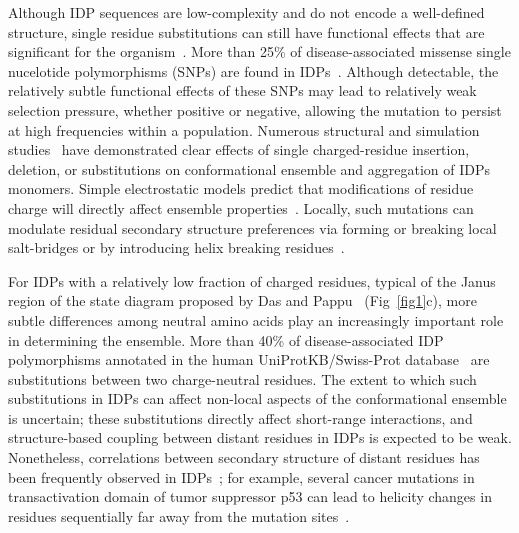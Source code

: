 \documentclass[10pt,letterpaper]{article}
\begin{document}
Although IDP sequences are low-complexity and do not encode a well-defined structure, single residue substitutions can still have functional effects that are significant for the organism~\cite{Uversky2008}. More than 25\% of disease-associated missense single nucelotide polymorphisms (SNPs) are found in IDPs~\cite{Vacic2012a}. Although detectable, the relatively subtle functional effects of these SNPs may lead to relatively weak selection pressure, whether positive or negative, allowing the mutation to persist at high frequencies within a population. Numerous structural and simulation studies~\cite{Larini2013b,Ganguly2015,Viet2014a,Viet2013,Truong2014a,Zhan2013a,Xu2013a} have demonstrated clear effects of single charged-residue insertion, deletion, or substitutions on conformational ensemble and aggregation of IDPs monomers. Simple electrostatic models predict that modifications of residue charge will directly affect ensemble properties~\cite{Das2015,Larini2013b,Bah2016,He2015}. Locally, such mutations can modulate residual secondary structure preferences via forming or breaking local salt-bridges or by introducing helix breaking residues~\cite{AlexanderConicella2016,Ganguly2015,Zhan2013a}. 

For IDPs with a relatively low fraction of charged residues, typical of the Janus region of the state diagram proposed by Das and Pappu~\cite{Das2015,Das2013} (Fig~\ref{fig1}c), more subtle differences among neutral amino acids play an increasingly important role in determining the ensemble. More than 40\% of disease-associated IDP polymorphisms annotated in the human UniProtKB/Swiss-Prot database~\cite{Yip2008} are substitutions between two charge-neutral residues. The extent to which such substitutions in IDPs can affect non-local aspects of the conformational ensemble is uncertain; these substitutions directly affect short-range interactions, and structure-based coupling between distant residues in IDPs is expected to be weak. Nonetheless, correlations between secondary structure of distant residues has been frequently observed in IDPs~\cite{Ganguly2015,Iesmantavicius2013,Feuerstein2012}; for example, several cancer mutations in transactivation domain of tumor suppressor p53 can lead to helicity changes in residues sequentially far away from the mutation sites~\cite{Ganguly2015}. 
\end{document}
